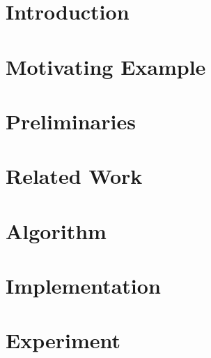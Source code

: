 \documentclass{llncs}
\begin{document}
 
 
\section{Introduction}
\label{sec:intro}



\section{Motivating Example}
\label{sec:mot-example}



\section{Preliminaries}
\label{sec:preliminaries}



\section{Related Work}
\label{sec:related-work}



\section{Algorithm}
\label{sec:algorithm}



\section{Implementation}
\label{sec:impl}



\section{Experiment}
\label{sec:experiment}

\end{document}
